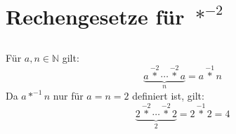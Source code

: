 \documentclass{article}
\begin{document}
\section{Rechengesetze f\"ur $\operatorname*{\ast}^{-2}$\newline}

\subsection{}
F\"ur $a, n \in \mathbb{N}$ gilt:
\[ \underbrace{a \operatorname*{\ast}^{-2} \dotsb \operatorname*{\ast}^{-2} a}_n = a\operatorname*{\ast}^{-1} n \]
Da $a\operatorname*{\ast}^{-1}n$ nur f\"ur $a=n=2$ definiert ist, gilt:
\[ \underbrace{2 \operatorname*{\ast}^{-2} \dotsb \operatorname*{\ast}^{-2} 2}_2 = 2 \operatorname*{\ast}^{-1} 2 = 4 \]
\end{document}
